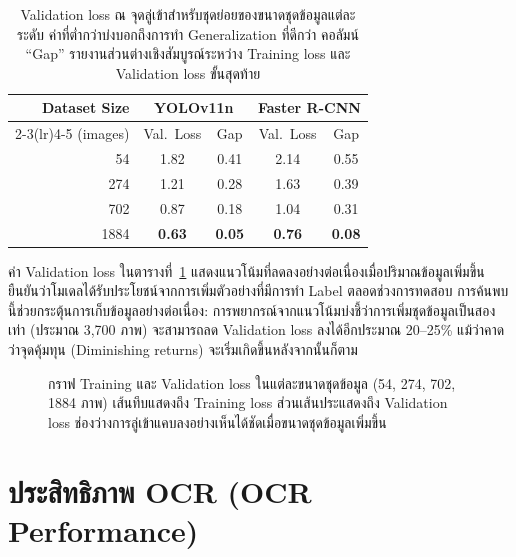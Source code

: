 \begin{table}[H]
  \centering
  \caption{Validation loss ณ จุดลู่เข้าสำหรับชุดย่อยของขนาดชุดข้อมูลแต่ละระดับ
           ค่าที่ต่ำกว่าบ่งบอกถึงการทำ Generalization ที่ดีกว่า
           คอลัมน์ ``Gap'' รายงานส่วนต่างเชิงสัมบูรณ์ระหว่าง Training loss และ Validation loss ขั้นสุดท้าย}
  \label{tab:dataset_ablation}
  \begin{tabular}{rcccc}
    \toprule
    \textbf{Dataset Size} &
    \multicolumn{2}{c}{\textbf{YOLOv11n}} &
    \multicolumn{2}{c}{\textbf{Faster R-CNN}} \\
    \cmidrule(lr){2-3}\cmidrule(lr){4-5}
    (images) & Val.\ Loss & Gap & Val.\ Loss & Gap \\
    \midrule
    54   & 1.82 & 0.41 & 2.14 & 0.55 \\
    274  & 1.21 & 0.28 & 1.63 & 0.39 \\
    702  & 0.87 & 0.18 & 1.04 & 0.31 \\
    1884 & \textbf{0.63} & \textbf{0.05} & \textbf{0.76} & \textbf{0.08} \\
    \bottomrule
  \end{tabular}
\end{table}

ค่า Validation loss ในตารางที่~\ref{tab:dataset_ablation} แสดงแนวโน้มที่ลดลงอย่างต่อเนื่องเมื่อปริมาณข้อมูลเพิ่มขึ้น
ยืนยันว่าโมเดลได้รับประโยชน์จากการเพิ่มตัวอย่างที่มีการทำ Label ตลอดช่วงการทดสอบ
การค้นพบนี้ช่วยกระตุ้นการเก็บข้อมูลอย่างต่อเนื่อง: การพยากรณ์จากแนวโน้มบ่งชี้ว่าการเพิ่มชุดข้อมูลเป็นสองเท่า (ประมาณ 3,700 ภาพ) จะสามารถลด Validation loss ลงได้อีกประมาณ 20--25\% แม้ว่าคาดว่าจุดคุ้มทุน (Diminishing returns) จะเริ่มเกิดขึ้นหลังจากนั้นก็ตาม

\begin{figure}[H]
  \centering
  \caption{กราฟ Training และ Validation loss ในแต่ละขนาดชุดข้อมูล (54, 274, 702, 1884 ภาพ)
           เส้นทึบแสดงถึง Training loss ส่วนเส้นประแสดงถึง Validation loss
           ช่องว่างการลู่เข้าแคบลงอย่างเห็นได้ชัดเมื่อขนาดชุดข้อมูลเพิ่มขึ้น}
  \label{fig:training_curves}
\end{figure}

\section{ประสิทธิภาพ OCR (OCR Performance)}
\label{sec:ocr_performance}

